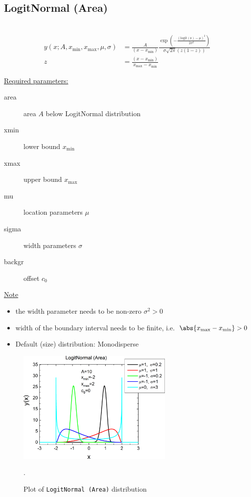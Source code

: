 \clearpage
\subsection{LogitNormal (Area)} ~\\
\label{sec:LogitArea}
\begin{align}
y(x; A,x_\mathrm{min},x_\mathrm{max},\mu,\sigma) &= \frac{A}{\left(x-x_\mathrm{min}\right)} \frac{\exp\left(-\frac{\left(\operatorname{logit(z)}-\mu\right)^2}{2\sigma^2}\right)} {\sigma\sqrt{2\pi}\left(z(1-z)\right)} \\
z &= \frac{\left(x-x_\mathrm{min}\right)}{x_\mathrm{max}-x_\mathrm{min}}
\end{align}

\underline{Required parameters:}
\begin{description}
    \item[area] area $A$ below LogitNormal distribution
    \item[xmin] lower bound $x_\mathrm{min}$
    \item[xmax] upper bound $x_\mathrm{max}$
    \item[mu] location parameters $\mu$
    \item[sigma] width parameters $\sigma$
    \item[backgr] offset $c_0$
\end{description}

\underline{Note}
\begin{itemize}
  \item the width parameter needs to be non-zero $\sigma^2 > 0$
  \item width of the boundary interval needs to be finite, i.e.\ $\abs{x_\mathrm{max}-x_\mathrm{min}}>0$
  \item Default (size) distribution: Monodisperse
\end{itemize}

\begin{figure}[htb]
\begin{center}
\includegraphics[width=0.6824\textwidth]{../images/peaks/LogitNormal/LogitArea.png}
\end{center}
\caption{Plot of \texttt{LogitNormal (Area)} distribution}.
\label{fig:LogitArea}
\end{figure}

